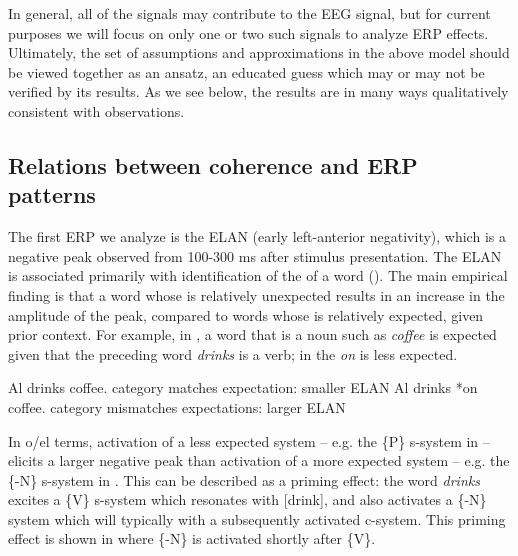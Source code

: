 In general, all of the  signals may contribute to the EEG signal, but for current purposes we will focus on only one or two such signals to analyze ERP effects. Ultimately, the set of assumptions and approximations in the above model should be viewed together as an ansatz, an educated guess which may or may not be verified by its results. As we see below, the results are in many ways qualitatively consistent with observations.

\subsection{Relations between coherence and ERP patterns}

The first ERP we analyze is the ELAN (early left-anterior negativity), which is a negative peak observed from 100-300 ms after stimulus presentation. The ELAN is associated primarily with identification of the  of a word (\citealt{Friederici2002,HahneFriederici1999,SteinhauerDrury2012}). The main empirical finding is that a word whose  is relatively unexpected results in an increase in the amplitude of the peak, compared to words whose  is relatively expected, given prior context. For example, in , a word that is a noun such as \textit{coffee} is expected given that the preceding word \textit{drinks} is a  verb; in  the  \textit{on} is less expected.

\ea\label{ex:6:23}
\ea\label{ex:6:23a} Al drinks coffee. \break category matches expectation: smaller ELAN
\ex\label{ex:6:23b} Al drinks *on coffee. \break category mismatches expectations: larger ELAN
\z
\z

In o/el terms, activation of a less expected system -- e.g. the \{P\} s-system in  -- elicits a larger negative peak than activation of a more expected system -- e.g. the \{-N\} s-system in . This can be described as a priming effect: the word \textit{drinks} excites a \{V\} s-system which resonates with [drink], and also activates a \{-N\} system which will typically  with a subsequently activated c-system. This priming effect is shown in {} where \{-N\} is activated shortly after \{V\}. 

